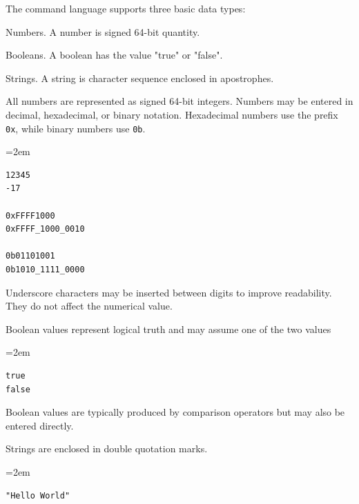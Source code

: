
The command language supports three basic data types:

\begin{smallGapItemize}
\item Numbers. A number is signed 64-bit quantity.
\item Booleans. A boolean has the value "true" or "false".
\item Strings. A string is character sequence enclosed in apostrophes.
\end{smallGapItemize}


All numbers are represented as signed 64-bit integers. Numbers may be entered in decimal, hexadecimal, or binary notation. Hexadecimal numbers use the prefix \verb|0x|, while binary numbers use \verb|0b|.

\begin{list}{}{\leftmargin=2em}
\item
\begin{verbatim}
12345
-17

0xFFFF1000
0xFFFF_1000_0010

0b01101001
0b1010_1111_0000
\end{verbatim}
\end{list}

Underscore characters may be inserted between digits to improve readability. They do not affect the numerical value.


Boolean values represent logical truth and may assume one of the two values

\begin{list}{}{\leftmargin=2em}
\item
\begin{verbatim}
true
false
\end{verbatim}
\end{list}

Boolean values are typically produced by comparison operators but may also be entered directly.


Strings are enclosed in double quotation marks.

\begin{list}{}{\leftmargin=2em}
\item
\begin{verbatim}
"Hello World"
\end{verbatim}
\end{list}

